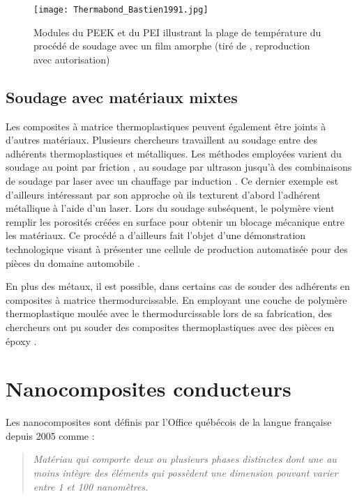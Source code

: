 \begin{figure}[h]
	\centering
	\texttt{[image: Thermabond\_Bastien1991.jpg]}
	\caption{Modules du PEEK et du PEI illustrant la plage de température du procédé de soudage avec un film amorphe (tiré de \cite{Bastien1991}, reproduction avec autorisation)}
	\label{fig:thermabond_process}
\end{figure}

\FloatBarrier
\subsection{Soudage avec matériaux mixtes}

Les composites à matrice thermoplastiques peuvent également être joints à d'autres matériaux. 
Plusieurs chercheurs travaillent au soudage entre des adhérents thermoplastiques et métalliques. 
Les méthodes employées varient du soudage au point par friction \cite{Goushegir2016}, au soudage par ultrason \cite{Balle2009,Kruger2004} jusqu'à des combinaisons de soudage par laser avec un chauffage par induction \cite{Weidmann2018}. 
Ce dernier exemple est d'ailleurs intéressant par son approche où ils texturent d'abord l'adhérent métallique à l'aide d'un laser. 
Lors du soudage subséquent, le polymère vient remplir les porosités créées en surface pour obtenir un blocage mécanique entre les matériaux. 
Ce procédé a d'ailleurs fait l'objet d'une démonstration technologique visant à présenter une cellule de production automatisée pour des pièces du domaine automobile \cite{Gardiner2019a}. 

En plus des métaux, il est possible, dans certains cas de souder des adhérents en composites à matrice thermodurcissable. 
En employant une couche de polymère thermoplastique moulée avec le thermodurcissable lors de sa fabrication, des chercheurs ont pu souder des composites thermoplastiques avec des pièces en époxy \cite{Lionetto2018a,FernandezVillegas2015}.

\section{Nanocomposites conducteurs}

Les nanocomposites sont définis par l'Office québécois de la langue française depuis 2005 comme : 

\begin{quote}
	\textit{Matériau qui comporte deux ou plusieurs phases distinctes dont une au moins intègre des éléments qui possèdent une dimension pouvant varier entre 1 et 100 nanomètres.}
\end{quote}

